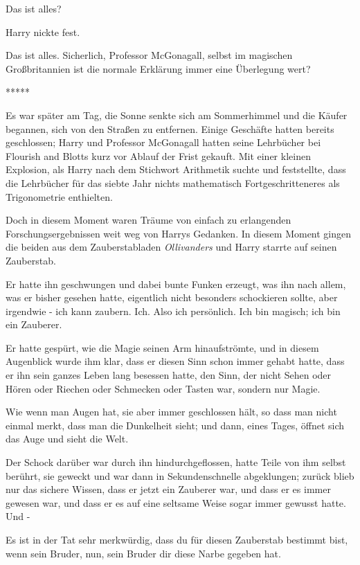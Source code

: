\glqq Das ist alles?\grqq{}

Harry nickte fest.

\glqq Das ist alles. Sicherlich, Professor McGonagall, selbst im magischen
Großbritannien ist die normale Erklärung immer eine Überlegung wert?\grqq{}

\begin{center}*****\end{center}

Es war später am Tag, die Sonne senkte sich am Sommerhimmel und die Käufer
begannen, sich von den Straßen zu entfernen. Einige Geschäfte hatten bereits
geschlossen; Harry und Professor McGonagall hatten seine Lehrbücher bei Flourish
and Blotts kurz vor Ablauf der Frist gekauft. Mit einer kleinen Explosion, als
Harry nach dem Stichwort \glqq Arithmetik\grqq{} suchte und feststellte, dass
die Lehrbücher für das siebte Jahr nichts mathematisch Fortgeschritteneres als
Trigonometrie enthielten.

Doch in diesem Moment waren Träume von einfach zu erlangenden
Forschungsergebnissen weit weg von Harrys Gedanken. In diesem Moment gingen die
beiden aus dem Zauberstabladen \emph{Ollivanders} und Harry starrte auf seinen
Zauberstab.

Er hatte ihn geschwungen und dabei bunte Funken erzeugt, was ihn nach allem, was
er bisher gesehen hatte, eigentlich nicht besonders schockieren sollte, aber
irgendwie - ich kann zaubern. Ich. Also ich persönlich. Ich bin magisch; ich bin
ein Zauberer.

Er hatte gespürt, wie die Magie seinen Arm hinaufströmte, und in diesem
Augenblick wurde ihm klar, dass er diesen Sinn schon immer gehabt hatte, dass er
ihn sein ganzes Leben lang besessen hatte, den Sinn, der nicht Sehen oder Hören
oder Riechen oder Schmecken oder Tasten war, sondern nur Magie.

Wie wenn man Augen hat, sie aber immer geschlossen hält, so dass man nicht
einmal merkt, dass man die Dunkelheit sieht; und dann, eines Tages, öffnet sich
das Auge und sieht die Welt.

Der Schock darüber war durch ihn hindurchgeflossen, hatte Teile von ihm selbst
berührt, sie geweckt und war dann in Sekundenschnelle abgeklungen; zurück blieb
nur das sichere Wissen, dass er jetzt ein Zauberer war, und dass er es immer
gewesen war, und dass er es auf eine seltsame Weise sogar immer gewusst hatte.
Und -

\glqq Es ist in der Tat sehr merkwürdig, dass du für diesen Zauberstab bestimmt
bist, wenn sein Bruder, nun, sein Bruder dir diese Narbe gegeben hat.\grqq{}

